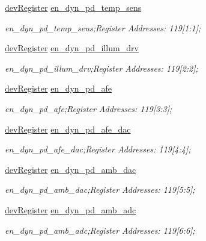\begin{DoxyCompactItemize}
\mbox{\hyperlink{classdev_register}{dev\+Register}} \mbox{\hyperlink{class_o_p_t3101_registers_a7e9d328faff345b7586508ef9fff74b3}{en\+\_\+dyn\+\_\+pd\+\_\+temp\+\_\+sens}}
\begin{DoxyCompactList}\small\item\em en\+\_\+dyn\+\_\+pd\+\_\+temp\+\_\+sens;Register Addresses\+: 119\mbox{[}1\+:1\mbox{]}; \end{DoxyCompactList}\item 
\mbox{\hyperlink{classdev_register}{dev\+Register}} \mbox{\hyperlink{class_o_p_t3101_registers_a2232f7a08f5802ded8b10f2bd5b63425}{en\+\_\+dyn\+\_\+pd\+\_\+illum\+\_\+drv}}
\begin{DoxyCompactList}\small\item\em en\+\_\+dyn\+\_\+pd\+\_\+illum\+\_\+drv;Register Addresses\+: 119\mbox{[}2\+:2\mbox{]}; \end{DoxyCompactList}\item 
\mbox{\hyperlink{classdev_register}{dev\+Register}} \mbox{\hyperlink{class_o_p_t3101_registers_a1d024f0ebab115594b49d5652f2edb4f}{en\+\_\+dyn\+\_\+pd\+\_\+afe}}
\begin{DoxyCompactList}\small\item\em en\+\_\+dyn\+\_\+pd\+\_\+afe;Register Addresses\+: 119\mbox{[}3\+:3\mbox{]}; \end{DoxyCompactList}\item 
\mbox{\hyperlink{classdev_register}{dev\+Register}} \mbox{\hyperlink{class_o_p_t3101_registers_ac696b5b40353a14fb5c1d7e2baf45305}{en\+\_\+dyn\+\_\+pd\+\_\+afe\+\_\+dac}}
\begin{DoxyCompactList}\small\item\em en\+\_\+dyn\+\_\+pd\+\_\+afe\+\_\+dac;Register Addresses\+: 119\mbox{[}4\+:4\mbox{]}; \end{DoxyCompactList}\item 
\mbox{\hyperlink{classdev_register}{dev\+Register}} \mbox{\hyperlink{class_o_p_t3101_registers_af5e6e0cfacb0fc6fd9cc06b100aa01f4}{en\+\_\+dyn\+\_\+pd\+\_\+amb\+\_\+dac}}
\begin{DoxyCompactList}\small\item\em en\+\_\+dyn\+\_\+pd\+\_\+amb\+\_\+dac;Register Addresses\+: 119\mbox{[}5\+:5\mbox{]}; \end{DoxyCompactList}\item 
\mbox{\hyperlink{classdev_register}{dev\+Register}} \mbox{\hyperlink{class_o_p_t3101_registers_ae952ca72d27c62fa0aef949b4d3ae50a}{en\+\_\+dyn\+\_\+pd\+\_\+amb\+\_\+adc}}
\begin{DoxyCompactList}\small\item\em en\+\_\+dyn\+\_\+pd\+\_\+amb\+\_\+adc;Register Addresses\+: 119\mbox{[}6\+:6\mbox{]}; \end{DoxyCompactList}\item 

\end{DoxyCompactItemize}

